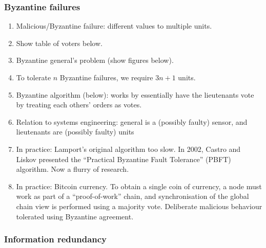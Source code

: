 \documentclass[11pt]{article}
\begin{document}
\subsubsection*{Byzantine failures}

\begin{enumerate}

 \item Malicious/Byzantine failure: different values to multiple units.

 \item Show table of voters below.

 \item Byzantine general's problem (show figures below).

 \item To tolerate $n$ Byzantine failures, we require $3n + 1$ units.

 \item Byzantine algorithm (below): works by essentially have the lieutenants vote by treating each others' orders as votes.

 \item Relation to systems engineering: general is a (possibly faulty) sensor, and lieutenants are (possibly faulty) units

 \item In practice: Lamport's original algorithm too slow. In 2002, Castro and Liskov presented the ``Practical Byzantine Fault Tolerance'' (PBFT) algorithm. Now a flurry of research.

 \item In practice: Bitcoin currency. To obtain a single coin of currency, a node must work as part of a ``proof-of-work'' chain, and synchronisation of the global chain view is performed using a majority vote. Deliberate malicious behaviour tolerated using Byzantine agreement.

\end{enumerate}

\subsubsection*{Information redundancy}
\end{document}
